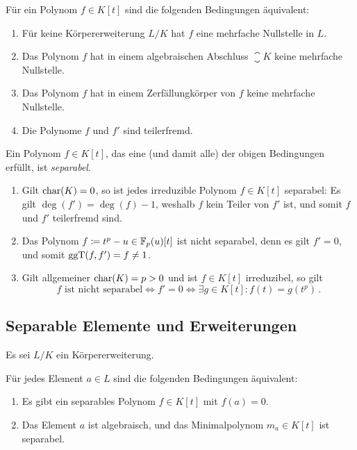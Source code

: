 \begin{corollary}
  Für ein Polynom $f \in K[t]$ sind die folgenden Bedingungen äquivalent:
  \begin{enumerate}
    \item
      Für keine Körpererweiterung $L/K$ hat $f$ eine mehrfache Nullstelle in $L$.
    \item
      Das Polynom $f$ hat in einem algebraischen Abschluss $\closure{K}$ keine mehrfache Nullstelle.
    \item
      Das Polynom $f$ hat in einem Zerfällungkörper von $f$ keine mehrfache Nullstelle.
    \item
      Die Polynome $f$ und $f'$ sind teilerfremd.
  \end{enumerate}
\end{corollary}

\begin{definition}
  Ein Polynom $f \in K[t]$, das eine \textup(und damit alle\textup) der obigen Bedingungen erfüllt, ist \emph{separabel}.
\end{definition}

\begin{example}
  \begin{enumerate}
    \item
      Gilt $\operatorname{char}(K) = 0$, so ist jedes irreduzible Polynom $f \in K[t]$ separabel:
      Es gilt $\deg(f') = \deg(f)-1$, weshalb $f$ kein Teiler von $f'$ ist, und somit $f$ und $f'$ teilerfremd sind.
    \item
      Das Polynom $f \coloneqq t^p - u \in \mathbb{F}_p(u)[t]$ ist nicht separabel, denn es gilt $f' = 0$, und somit $\operatorname{ggT}(f,f') = f \neq 1$.
    \item
      Gilt allgemeiner $\operatorname{char}(K) = p > 0$ und ist $f \in K[t]$ irreduzibel, so gilt
      \[
              \text{$f$ ist nicht separabel}
        \iff  f' = 0
        \iff  \exists g \in K[t] : f(t) = g(t^p) \,.
      \]

  \end{enumerate}
\end{example}



\subsection{Separable Elemente und Erweiterungen}

Es sei $L/K$ ein Körpererweiterung.

\begin{lemma}
  Für jedes Element $a \in L$ sind die folgenden Bedingungen äquivalent:
  \begin{enumerate}
    \item
      Es gibt ein separables Polynom $f \in K[t]$ mit $f(a) = 0$.
    \item
      Das Element $a$ ist algebraisch, und das Minimalpolynom $m_a \in K[t]$ ist separabel.
  \end{enumerate}
\end{lemma}


